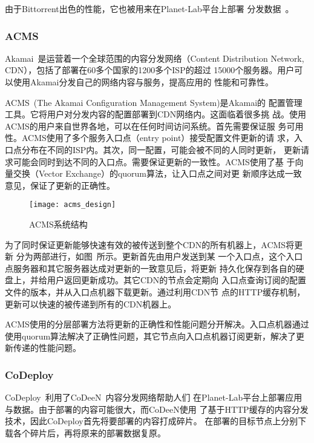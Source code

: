 由于Bittorrent出色的性能，它也被用来在Planet-Lab平台上部署
分发数据~\cite{plDist}。

\subsubsection*{ACMS}

Akamai~\cite{akamai}是运营着一个全球范围的内容分发网络（Content
Distribution Network, CDN），包括了部署在60多个国家的1200多个ISP的超过
15000个服务器。用户可以使用Akamai分发自己的网络内容与服务，提高应用的
性能和可靠性。

ACMS~\cite{acms}(The Akamai Configuration Management System)是Akamai的
配置管理工具。它将用户对分发内容的配置部署到CDN网络内。这面临着很多挑
战。使用ACMS的用户来自世界各地，可以在任何时间访问系统。首先需要保证服
务可用性。ACMS使用了多个服务入口点（entry point）接受配置文件更新的请
求，入口点分布在不同的ISP内。其次，同一配置，可能会被不同的人同时更新，
更新请求可能会同时到达不同的入口点。需要保证更新的一致性。ACMS使用了基
于向量交换（Vector Exchange）的quorum算法，让入口点之间对更
新顺序达成一致意见，保证了更新的正确性。

\begin{figure}
\centering
\texttt{[image: acms\_design]}
\caption{ACMS系统结构}
\label{fig:acms_design}
\end{figure}


为了同时保证更新能够快速有效的被传送到整个CDN的所有机器上，ACMS将更新
分为两部进行，如图~\cite{fig:acms_design}所示。更新首先由用户发送到某
一个入口点，这个入口点服务器和其它服务器达成对更新的一致意见后，将更新
持久化保存到各自的硬盘上，并给用户返回更新成功。其它CDN的节点会定期向
入口点查询订阅的配置文件的版本，并从入口点机器下载更新。通过利用CDN节
点的HTTP缓存机制，更新可以快速的被传递到所有的CDN机器上。

ACMS使用的分层部署方法将更新的正确性和性能问题分开解决。入口点机器通过
使用quorum算法解决了正确性问题，其它节点向入口点机器订阅更新，解决了更
新传递的性能问题。

\subsubsection*{CoDeploy}

CoDeploy~\cite{codeploy}利用了CoDeeN~\cite{codeen}内容分发网络帮助人们
在Planet-Lab平台上部署应用与数据。由于部署的内容可能很大，而CoDeeN使用
了基于HTTP缓存的内容分发技术，因此CoDeploy首先将要部署的内容打成碎片。
在部署的目标节点上分别下载各个碎片后，再将原来的部署数据复原。

